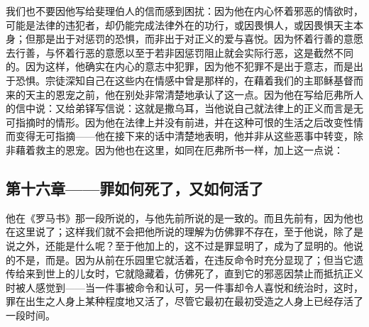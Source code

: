 我们也不要因他写给斐理伯人的信而感到困扰：因为他在内心怀着邪恶的情欲时，可能是法律的违犯者，却仍能完成法律外在的功行，或因畏惧人，或因畏惧天主本身；但那是出于对惩罚的恐惧，而非出于对正义的爱与喜悦。因为怀着行善的意愿去行善，与怀着行恶的意愿以至于若非因惩罚阻止就会实际行恶，这是截然不同的。因为这样，他确实在内心的意志中犯罪，因为他不犯罪不是出于意志，而是出于恐惧。宗徒深知自己在这些内在情感中曾是那样的，在藉着我们的主耶稣基督而来的天主的恩宠之前，他在别处非常清楚地承认了这一点。因为他在写给厄弗所人的信中说：又给弟铎写信说：这就是撒乌耳，当他说自己就法律上的正义而言是无可指摘时的情形。因为他在法律上并没有前进，并在这种可恨的生活之后改变性情而变得无可指摘——他在接下来的话中清楚地表明，他并非从这些恶事中转变，除非藉着救主的恩宠。因为他也在这里，如同在厄弗所书一样，加上这一点说：\par


\subsection{第十六章——罪如何死了，又如何活了}

他在《罗马书》那一段所说的，与他先前所说的是一致的。而且先前有，因为他也在这里说了；这样我们就不会把他所说的理解为仿佛罪不存在，至于他说，除了是说之外，还能是什么呢？至于他加上的，这不过是罪显明了，成为了显明的。他说的不是，而是。因为从前在乐园里它就活着，在违反命令时充分显现了；但当它遗传给来到世上的儿女时，它就隐藏着，仿佛死了，直到它的邪恶因禁止而抵抗正义时被人感觉到——当一件事被命令和认可，另一件事却令人喜悦和统治时，这时，罪在出生之人身上某种程度地又活了，尽管它最初在最初受造之人身上已经存活了一段时间。\par

